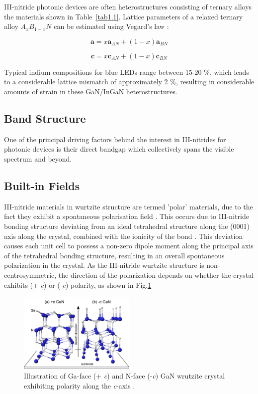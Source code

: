 III-nitride photonic devices are often heterostructures consisting of ternary alloys the materials shown in Table~\ref{tab1.1}. Lattice parameters of a relaxed ternary alloy $A_{x}B_{1-x}N$ can be estimated using Vegard's law \cite{Vickers2003}:

\begin{equation}
\mathbf{a} = x \mathbf{a}_{AN} + (1-x)\mathbf{a}_{BN}
\end{equation}

\begin{equation}
\mathbf{c} = x \mathbf{c}_{AN} + (1-x)\mathbf{c}_{BN}
\end{equation}

Typical indium compositions for blue LEDs range between 15-20 $\%$, which leads to a considerable lattice mismatch of approximately 2 $\%$, resulting in considerable amounts of strain in these GaN/InGaN heterostructures.

\subsection{Band Structure} 
\label{section1.1.2}

One of the principal driving factors behind the interest in III-nitrides for photonic devices is their direct bandgap which collectively spans the visible spectrum and beyond.


\subsection{Built-in Fields} 
\label{section1.1.3}
III-nitride materials in wurtzite structure are termed 'polar' materials, due to the fact they exhibit a spontaneous polarisation field \cite{Ambacher2002}. This occurs due to III-nitride bonding structure deviating from an ideal tetrahedral structure along the (0001) axis along the crystal, combined with the ionicity of the bond \cite{Ren2015}. This deviation causes each unit cell to possess a non-zero dipole moment along the principal axis of the tetrahedral bonding structure, resulting in an overall spontaneous polarization in the crystal. As the III-nitride wurtzite structure is non-centrosymmetric, the direction of the polarization depends on whether the crystal exhibits (+ {\it c}) or (-{\it c}) polarity, as shown in Fig.\ref{1.3}

\begin{figure}[h]
	\centering
	\includegraphics[width=0.5\textwidth]{Figs/Ch1/p2.png}
	\caption {Illustration of Ga-face (+ {\it c}) and N-face (-{\it c}) GaN wrutzite crystal exhibiting polarity along the {\it c}-axis \cite{Sumiya2004}.}
	\label{1.3}
\end{figure}
\FloatBarrier

